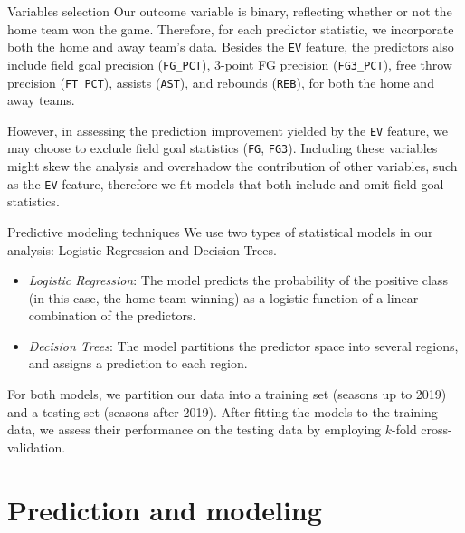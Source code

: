 \documentclass[
  ignorenonframetext,
]{beamer}
\begin{document}
\begin{frame}[fragile]{Variables selection}
\protect\hypertarget{variables-selection}{}
Our outcome variable is binary, reflecting whether or not the home team
won the game. Therefore, for each predictor statistic, we incorporate
both the home and away team's data. Besides the \texttt{EV} feature, the
predictors also include field goal precision (\texttt{FG\_PCT}), 3-point
FG precision (\texttt{FG3\_PCT}), free throw precision
(\texttt{FT\_PCT}), assists (\texttt{AST}), and rebounds (\texttt{REB}),
for both the home and away teams.

However, in assessing the prediction improvement yielded by the
\texttt{EV} feature, we may choose to exclude field goal statistics
(\texttt{FG}, \texttt{FG3}). Including these variables might skew the
analysis and overshadow the contribution of other variables, such as the
\texttt{EV} feature, therefore we fit models that both include and omit
field goal statistics.
\end{frame}

\begin{frame}{Predictive modeling techniques}
\protect\hypertarget{predictive-modeling-techniques}{}
We use two types of statistical models in our analysis: Logistic
Regression and Decision Trees.

\begin{itemize}
\item
  \emph{Logistic Regression}: The model predicts the probability of the
  positive class (in this case, the home team winning) as a logistic
  function of a linear combination of the predictors.
\item
  \emph{Decision Trees}: The model partitions the predictor space into
  several regions, and assigns a prediction to each region.
\end{itemize}

For both models, we partition our data into a training set (seasons up
to 2019) and a testing set (seasons after 2019). After fitting the
models to the training data, we assess their performance on the testing
data by employing \(k\)-fold cross-validation.
\end{frame}

\hypertarget{prediction-and-modeling}{%
\section{Prediction and modeling}\label{prediction-and-modeling}}
\end{document}
